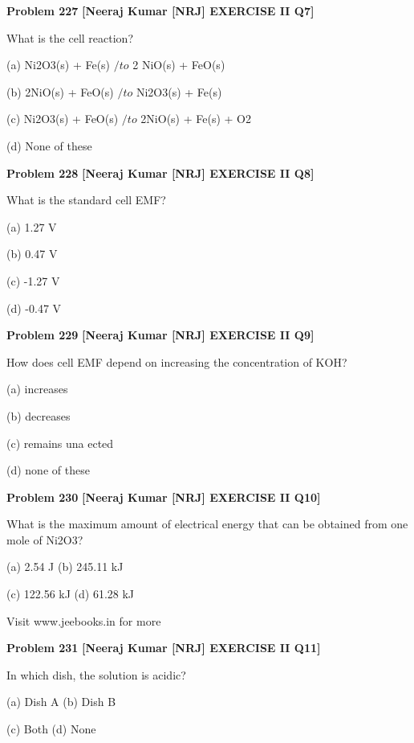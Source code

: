 \begin{problembox}
\textbf{Problem 227} \hfill \textbf{[Neeraj Kumar [NRJ] EXERCISE II Q7]}
\label{q:ext-nrj_all_questions-227}

What is the cell reaction?
 
 (a) Ni2O3(s) + Fe(s) $/to$ 2 NiO(s) + FeO(s)
 
 (b) 2NiO(s) + FeO(s) $/to$ Ni2O3(s) + Fe(s)
 
 (c)  Ni2O3(s) + FeO(s) $/to$ 2NiO(s) + Fe(s) + O2
 
 (d) None of these
\end{problembox}

\begin{problembox}
\textbf{Problem 228} \hfill \textbf{[Neeraj Kumar [NRJ] EXERCISE II Q8]}
\label{q:ext-nrj_all_questions-228}

What is the standard cell EMF?
 
 (a) 1.27 V
 
 (b) 0.47 V
 
 (c) -1.27 V
 
 (d) -0.47 V
\end{problembox}

\begin{problembox}
\textbf{Problem 229} \hfill \textbf{[Neeraj Kumar [NRJ] EXERCISE II Q9]}
\label{q:ext-nrj_all_questions-229}

How does cell EMF depend on increasing the 
concentration of KOH?
 
 (a) increases
 
 (b) decreases
 
 (c) remains una  ected
 
 (d) none of these
\end{problembox}

\begin{problembox}
\textbf{Problem 230} \hfill \textbf{[Neeraj Kumar [NRJ] EXERCISE II Q10]}
\label{q:ext-nrj_all_questions-230}

What is the maximum amount of electrical energy 
that can be obtained from one mole of Ni2O3?
 
 (a) 2.54 J 
(b) 245.11 kJ
 
 (c) 122.56 kJ 
(d) 61.28 kJ
 
 
Visit www.jeebooks.in for more
\end{problembox}

\begin{problembox}
\textbf{Problem 231} \hfill \textbf{[Neeraj Kumar [NRJ] EXERCISE II Q11]}
\label{q:ext-nrj_all_questions-231}

In which dish, the solution is acidic?
 
 (a) Dish A 
(b) Dish B
 
 (c) Both 
(d) None
\end{problembox}


